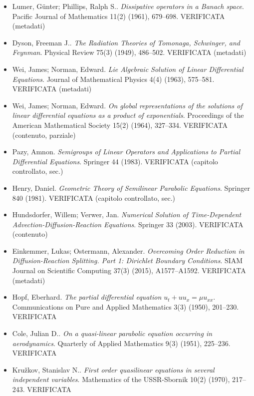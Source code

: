 \begin{itemize}[itemsep=2pt,leftmargin=1.2em,font=\small]
\item Lumer, G{\"u}nter; Phillips, Ralph S.. \emph{Dissipative operators in a {B}anach space}. Pacific Journal of Mathematics 11(2) (1961), 679--698. \textsf{\footnotesize VERIFICATA (metadati)}
\item Dyson, Freeman J.. \emph{The Radiation Theories of {T}omonaga, {S}chwinger, and {F}eynman}. Physical Review 75(3) (1949), 486--502. \textsf{\footnotesize VERIFICATA (metadati)}
\item Wei, James; Norman, Edward. \emph{Lie Algebraic Solution of Linear Differential Equations}. Journal of Mathematical Physics 4(4) (1963), 575--581. \textsf{\footnotesize VERIFICATA (metadati)}
\item Wei, James; Norman, Edward. \emph{On global representations of the solutions of linear differential equations as a product of exponentials}. Proceedings of the American Mathematical Society 15(2) (1964), 327--334. \textsf{\footnotesize VERIFICATA (contenuto, parziale)}
\item Pazy, Amnon. \emph{Semigroups of Linear Operators and Applications to Partial Differential Equations}. Springer 44 (1983). \textsf{\footnotesize VERIFICATA (capitolo controllato, sec.)}
\item Henry, Daniel. \emph{Geometric Theory of Semilinear Parabolic Equations}. Springer 840 (1981). \textsf{\footnotesize VERIFICATA (capitolo controllato, sec.)}
\item Hundsdorfer, Willem; Verwer, Jan. \emph{Numerical Solution of Time-Dependent Advection-Diffusion-Reaction Equations}. Springer 33 (2003). \textsf{\footnotesize VERIFICATA (contenuto)}
\item Einkemmer, Lukas; Ostermann, Alexander. \emph{Overcoming Order Reduction in Diffusion-Reaction Splitting. {P}art 1: {D}irichlet Boundary Conditions}. SIAM Journal on Scientific Computing 37(3) (2015), A1577--A1592. \textsf{\footnotesize VERIFICATA (metadati)}
\item Hopf, Eberhard. \emph{The partial differential equation $u_t + uu_x = \mu u_{xx}$}. Communications on Pure and Applied Mathematics 3(3) (1950), 201--230. \textsf{\footnotesize VERIFICATA}
\item Cole, Julian D.. \emph{On a quasi-linear parabolic equation occurring in aerodynamics}. Quarterly of Applied Mathematics 9(3) (1951), 225--236. \textsf{\footnotesize VERIFICATA}
\item Kru{\v z}kov, Stanislav N.. \emph{First order quasilinear equations in several independent variables}. Mathematics of the USSR-Sbornik 10(2) (1970), 217--243. \textsf{\footnotesize VERIFICATA}

\end{itemize}
